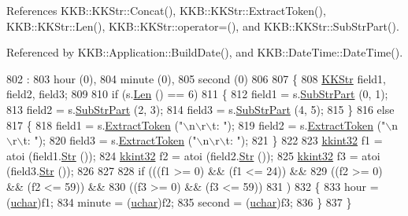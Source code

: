 References K\+K\+B\+::\+K\+K\+Str\+::\+Concat(), K\+K\+B\+::\+K\+K\+Str\+::\+Extract\+Token(), K\+K\+B\+::\+K\+K\+Str\+::\+Len(), K\+K\+B\+::\+K\+K\+Str\+::operator=(), and K\+K\+B\+::\+K\+K\+Str\+::\+Sub\+Str\+Part().



Referenced by K\+K\+B\+::\+Application\+::\+Build\+Date(), and K\+K\+B\+::\+Date\+Time\+::\+Date\+Time().


\begin{DoxyCode}
802                            :
803    hour   (0),
804    minute (0),
805    second (0)
806 
807 \{
808   \hyperlink{class_k_k_b_1_1_k_k_str}{KKStr}  field1, field2, field3;
809 
810   \textcolor{keywordflow}{if}  (s.\hyperlink{class_k_k_b_1_1_k_k_str_a869142d4855517c5c237afcb25dbbe36}{Len} () == 6)
811   \{
812     field1 = s.\hyperlink{class_k_k_b_1_1_k_k_str_a5f20b2ddfc9f07c8ef99592810332ddb}{SubStrPart} (0, 1);
813     field2 = s.\hyperlink{class_k_k_b_1_1_k_k_str_a5f20b2ddfc9f07c8ef99592810332ddb}{SubStrPart} (2, 3);
814     field3 = s.\hyperlink{class_k_k_b_1_1_k_k_str_a5f20b2ddfc9f07c8ef99592810332ddb}{SubStrPart} (4, 5);
815   \}
816   \textcolor{keywordflow}{else}
817   \{
818     field1 = s.\hyperlink{class_k_k_b_1_1_k_k_str_acc31c95308d6d699debde883c11e5802}{ExtractToken} (\textcolor{stringliteral}{"\(\backslash\)n\(\backslash\)r\(\backslash\)t: "});
819     field2 = s.\hyperlink{class_k_k_b_1_1_k_k_str_acc31c95308d6d699debde883c11e5802}{ExtractToken} (\textcolor{stringliteral}{"\(\backslash\)n\(\backslash\)r\(\backslash\)t: "});
820     field3 = s.\hyperlink{class_k_k_b_1_1_k_k_str_acc31c95308d6d699debde883c11e5802}{ExtractToken} (\textcolor{stringliteral}{"\(\backslash\)n\(\backslash\)r\(\backslash\)t: "});
821   \}
822 
823   \hyperlink{namespace_k_k_b_a8fa4952cc84fda1de4bec1fbdd8d5b1b}{kkint32}  f1 = atoi (field1.\hyperlink{class_k_k_b_1_1_k_k_str_ad574e6c0fe7f6ce1ba3ab0a8ce2fbd52}{Str} ());
824   \hyperlink{namespace_k_k_b_a8fa4952cc84fda1de4bec1fbdd8d5b1b}{kkint32}  f2 = atoi (field2.\hyperlink{class_k_k_b_1_1_k_k_str_ad574e6c0fe7f6ce1ba3ab0a8ce2fbd52}{Str} ());
825   \hyperlink{namespace_k_k_b_a8fa4952cc84fda1de4bec1fbdd8d5b1b}{kkint32}  f3 = atoi (field3.\hyperlink{class_k_k_b_1_1_k_k_str_ad574e6c0fe7f6ce1ba3ab0a8ce2fbd52}{Str} ());
826  
827 
828   \textcolor{keywordflow}{if}  (((f1 >= 0)  &&  (f1 <= 24))  &&
829        ((f2 >= 0)  &&  (f2 <= 59))  &&
830        ((f3 >= 0)  &&  (f3 <= 59))
831       )
832   \{
833     hour    = (\hyperlink{namespace_k_k_b_ace9969169bf514f9ee6185186949cdf7}{uchar})f1;
834     minute  = (\hyperlink{namespace_k_k_b_ace9969169bf514f9ee6185186949cdf7}{uchar})f2;
835     second  = (\hyperlink{namespace_k_k_b_ace9969169bf514f9ee6185186949cdf7}{uchar})f3;
836   \}
837 \}
\end{DoxyCode}


